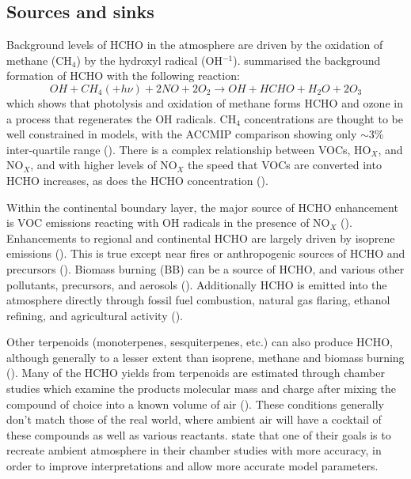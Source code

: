   \subsection{Sources and sinks}
    \label{LR:HCHO:Sources}
     
    Background levels of HCHO in the atmosphere are driven by the oxidation of methane (CH$_4$) by the hydroxyl radical (OH$^{-1}$).
    \cite{Atkinson2000} summarised the background formation of HCHO with the following reaction:
    \begin{equation*} \label{LR:HCHO:Sources:eqn_MethaneBackground}
      OH + CH_4 (+ h\nu) + 2NO + 2O_2 \rightarrow OH + HCHO + H_2O + 2O_3
    \end{equation*}
    which shows that photolysis and oxidation of methane forms HCHO and ozone in a process that regenerates the OH radicals.
    CH$_4$ concentrations are thought to be well constrained in models, with the ACCMIP comparison showing only $\sim3$\% inter-quartile range (\cite{Young2013}).
    There is a complex relationship between VOCs, HO$_X$, and NO$_X$, and with higher levels of NO$_X$ the speed that VOCs are converted into HCHO increases, as does the HCHO concentration (\cite{Wolfe2016}).
    
    Within the continental boundary layer, the major source of HCHO enhancement is VOC emissions reacting with OH radicals in the presence of NO$_X$ (\cite{Wagner2002, Millet2006, Kefauver2014}).
    Enhancements to regional and continental HCHO are largely driven by isoprene emissions (\cite{Guenther1995, Palmer2003, Shim2005, Kefauver2014}).
    This is true except near fires or anthropogenic sources of HCHO and precursors (\cite{Guenther1995, Kefauver2014, Wolfe2016}).
    Biomass burning (BB) can be a source of HCHO, and various other pollutants, precursors, and aerosols (\cite{Guenther1995, Andreae2001}).
    Additionally HCHO is emitted into the atmosphere directly through fossil fuel combustion, natural gas flaring, ethanol refining, and agricultural activity (\cite{Wolfe2016}).
    
    Other terpenoids (monoterpenes, sesquiterpenes, etc.) can also produce HCHO, although generally to a lesser extent than isoprene, methane and biomass burning (\cite{Guenther2012}).
    Many of the HCHO yields from terpenoids are estimated through chamber studies which examine the products molecular mass and charge after mixing the compound of choice into a known volume of air (\cite[eg.]{Nguyen2014}).
    These conditions generally don't match those of the real world, where ambient air will have a cocktail of these compounds as well as various reactants.
    \cite{Nguyen2014} state that one of their goals is to recreate ambient atmosphere in their chamber studies with more accuracy, in order to improve interpretations and allow more accurate model parameters.
    
